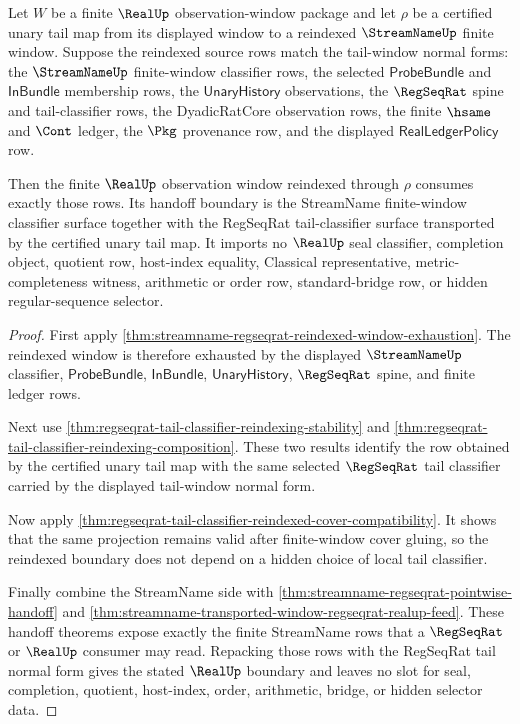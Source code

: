 \begin{theorem}
\label{thm:realup-regseqrat-tail-window-reindexing-boundary}
Let $W$ be a finite $\RealUp$ observation-window package and let $\rho$ be a
certified unary tail map from its displayed window to a reindexed
$\StreamNameUp$ finite window. Suppose the reindexed source rows match the
tail-window normal forms: the $\StreamNameUp$ finite-window classifier rows,
the selected $\mathsf{ProbeBundle}$ and $\mathsf{InBundle}$ membership rows,
the $\mathsf{UnaryHistory}$ observations, the $\RegSeqRat$ spine and
tail-classifier rows, the DyadicRatCore observation rows, the finite
$\hsame$ and $\Cont$ ledger, the $\Pkg$ provenance row, and the displayed
$\mathsf{RealLedgerPolicy}$ row.

Then the finite $\RealUp$ observation window reindexed through $\rho$ consumes
exactly those rows. Its handoff boundary is the StreamName finite-window
classifier surface together with the RegSeqRat tail-classifier surface
transported by the certified unary tail map. It imports no $\RealUp$ seal
classifier, completion object, quotient row, host-index equality,
Classical representative, metric-completeness witness, arithmetic or order
row, standard-bridge row, or hidden regular-sequence selector.
\end{theorem}
\begin{proof}
First apply
\autoref{thm:streamname-regseqrat-reindexed-window-exhaustion}. The reindexed
window is therefore exhausted by the displayed $\StreamNameUp$ classifier,
$\mathsf{ProbeBundle}$, $\mathsf{InBundle}$, $\mathsf{UnaryHistory}$,
$\RegSeqRat$ spine, and finite ledger rows.

Next use
\autoref{thm:regseqrat-tail-classifier-reindexing-stability} and
\autoref{thm:regseqrat-tail-classifier-reindexing-composition}. These two
results identify the row obtained by the certified unary tail map with the
same selected $\RegSeqRat$ tail classifier carried by the displayed
tail-window normal form.

Now apply
\autoref{thm:regseqrat-tail-classifier-reindexed-cover-compatibility}. It
shows that the same projection remains valid after finite-window cover
gluing, so the reindexed boundary does not depend on a hidden choice of local
tail classifier.

Finally combine the StreamName side with
\autoref{thm:streamname-regseqrat-pointwise-handoff} and
\autoref{thm:streamname-transported-window-regseqrat-realup-feed}. These
handoff theorems expose exactly the finite StreamName rows that a
$\RegSeqRat$ or $\RealUp$ consumer may read. Repacking those rows with the
RegSeqRat tail normal form gives the stated $\RealUp$ boundary and leaves no
slot for seal, completion, quotient, host-index, order, arithmetic, bridge, or
hidden selector data.
\end{proof}


